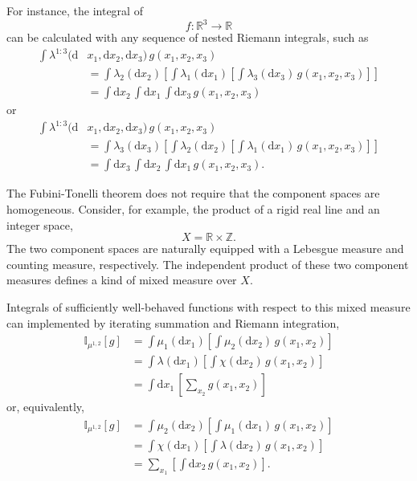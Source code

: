 \documentclass[
  letterpaper,
  DIV=11,
  numbers=noendperiod]{scrartcl}
\begin{document}
For instance, the integral of \[
f : \mathbb{R}^{3} \rightarrow \mathbb{R}
\] can be calculated with any sequence of nested Riemann integrals, such
as \begin{align*}
\int \lambda^{1:3}(
  \mathrm{d} &x_{1}, \mathrm{d} x_{2}, \mathrm{d} x_{3}
) \,
g( x_{1}, x_{2}, x_{3} )
\\
&=
\int \lambda_{2} ( \mathrm{d} x_{2} ) \left[
  \int \lambda_{1} ( \mathrm{d} x_{1} ) \left[
    \int \lambda_{3} ( \mathrm{d} x_{3} ) \,
      g( x_{1}, x_{2}, x_{3} )
  \right]
\right]
\\
&=
\int \mathrm{d} x_{2} \,
  \int \mathrm{d} x_{1} \,
    \int \mathrm{d} x_{3} \,
      g( x_{1}, x_{2}, x_{3} )
\end{align*} or \begin{align*}
\int \lambda^{1:3}(
  \mathrm{d} &x_{1}, \mathrm{d} x_{2}, \mathrm{d} x_{3}
) \,
g( x_{1}, x_{2}, x_{3} )
\\
&=
\int \lambda_{3} ( \mathrm{d} x_{3} ) \left[
  \int \lambda_{2} ( \mathrm{d} x_{2} ) \left[
    \int \lambda_{1} ( \mathrm{d} x_{1} ) \,
      g( x_{1}, x_{2}, x_{3} )
  \right]
\right]
\\
&=
\int \mathrm{d} x_{3} \,
  \int \mathrm{d} x_{2} \,
    \int \mathrm{d} x_{1} \,
      g( x_{1}, x_{2}, x_{3} ).
\end{align*}

The Fubini-Tonelli theorem does not require that the component spaces
are homogeneous. Consider, for example, the product of a rigid real line
and an integer space, \[
X = \mathbb{R} \times \mathbb{Z}.
\] The two component spaces are naturally equipped with a Lebesgue
measure and counting measure, respectively. The independent product of
these two component measures defines a kind of mixed measure over \(X\).

Integrals of sufficiently well-behaved functions with respect to this
mixed measure can implemented by iterating summation and Riemann
integration, \begin{align*}
\mathbb{I}_{ \mu^{1,2} }[ g ]
&=
\int \mu_{1} ( \mathrm{d} x_{1} )
\left[
  \int \mu_{2} ( \mathrm{d} x_{2} ) \, g( x_{1}, x_{2} )
\right]
\\
&=
\int \lambda ( \mathrm{d} x_{1} )
\left[
  \int \chi ( \mathrm{d} x_{2} ) \, g( x_{1}, x_{2} )
\right]
\\
&=
\int \mathrm{d} x_{1} \, \left[
  \sum_{ x_{2} } g( x_{1}, x_{2} )
\right]
\end{align*} or, equivalently, \begin{align*}
\mathbb{I}_{ \mu^{1,2} }[ g ]
&=
\int \mu_{2} ( \mathrm{d} x_{2} )
\left[
  \int \mu_{1} ( \mathrm{d} x_{1} ) \, g( x_{1}, x_{2} )
\right]
\\
&=
\int \chi ( \mathrm{d} x_{1} )
\left[
  \int \lambda ( \mathrm{d} x_{2} ) \, g( x_{1}, x_{2} )
\right]
\\
&=
\sum_{ x_{1} } \left[
  \int \mathrm{d} x_{2} \, g( x_{1}, x_{2} )
\right].
\end{align*}
\end{document}
